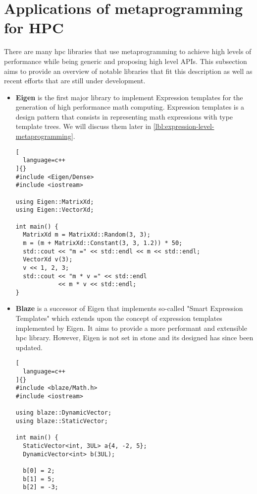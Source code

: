 \documentclass[../main]{subfiles}
\begin{document}
\section{
  Applications of metaprogramming for HPC
}

There are many \cpp \gls{hpc} libraries that use metaprogramming to achieve
high levels of performance while being generic and proposing high level APIs.
This subsection aims to provide an overview of notable libraries that fit this
description as well as recent efforts that are still under development.

\begin{itemize}

\item
\textbf{Eigen} \cite{eigen} is the first major \cpp library to implement
Expression templates for the generation of high performance math computing.
Expression templates is a \cpp design pattern that consists in representing
math expressions with type template trees. We will discuss them later
in \ref{lbl:expression-level-metaprogramming}.

\begin{lstlisting}[
  language=c++
]{}
#include <Eigen/Dense>
#include <iostream>

using Eigen::MatrixXd;
using Eigen::VectorXd;

int main() {
  MatrixXd m = MatrixXd::Random(3, 3);
  m = (m + MatrixXd::Constant(3, 3, 1.2)) * 50;
  std::cout << "m =" << std::endl << m << std::endl;
  VectorXd v(3);
  v << 1, 2, 3;
  std::cout << "m * v =" << std::endl
            << m * v << std::endl;
}
\end{lstlisting}

\item
\textbf{Blaze} \cite{blazelib} is a successor of Eigen that implements so-called
"Smart Expression Templates" which extends upon the concept of
expression templates implemented by Eigen. It aims to provide a more performant
and extensible \gls{hpc} library. However, Eigen is not set in stone
and its designed has since been updated.

\begin{lstlisting}[
  language=c++
]{}
#include <blaze/Math.h>
#include <iostream>

using blaze::DynamicVector;
using blaze::StaticVector;

int main() {
  StaticVector<int, 3UL> a{4, -2, 5};
  DynamicVector<int> b(3UL);

  b[0] = 2;
  b[1] = 5;
  b[2] = -3;


\end{lstlisting}
\end{itemize}
\end{document}
